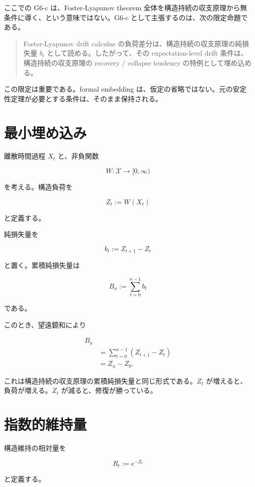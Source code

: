 \documentclass[12pt,a4paper]{article}
\begin{document}
ここでの G6-c は、Foster-Lyapunov theorem 全体を構造持続の収支原理から無条件に導く、という意味ではない。G6-c として主張するのは、次の限定命題である。

\begin{quote}
Foster-Lyapunov drift calculus の負荷差分は、構造持続の収支原理の純損失量 $b_{t}$ として読める。したがって、その expectation-level drift 条件は、構造持続の収支原理の recovery / collapse tendency の特例として埋め込める。
\end{quote}

この限定は重要である。formal embedding は、仮定の省略ではない。元の安定性定理が必要とする条件は、そのまま保持される。

\section{最小埋め込み}\label{ux6700ux5c0fux57cbux3081ux8fbcux307f}

離散時間過程 \(X_{t}\) と、非負関数

\[
W:\mathcal X\to [0,\infty)
\]

を考える。構造負荷を

\[
Z_{t} := W(X_{t})
\]

と定義する。

純損失量を

\[
b_{t} := Z_{t+1}-Z_{t}
\]

と置く。累積純損失量は

\[
B_{n} := \sum_{t=0}^{n-1} b_{t}
\]

である。

このとき、望遠鏡和により

\[
\begin{aligned}
B_{n} \\
&= \sum_{t=0}^{n-1}(Z_{t+1}-Z_{t}) \\
&= Z_{n}-Z_0.
\end{aligned}
\]

これは構造持続の収支原理の累積純損失量と同じ形式である。\(Z_{t}\) が増えると、負荷が増える。\(Z_{t}\) が減ると、修復が勝っている。

\section{指数的維持量}\label{ux6307ux6570ux7684ux7dadux6301ux91cf}

構造維持の相対量を

\[
R_{t} := e^{-Z_{t}}
\]

と定義する。
\end{document}
